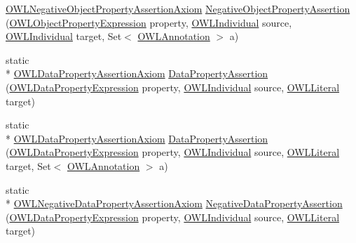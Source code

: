 \begin{DoxyCompactItemize}
\hyperlink{interfaceorg_1_1semanticweb_1_1owlapi_1_1model_1_1_o_w_l_negative_object_property_assertion_axiom}{O\-W\-L\-Negative\-Object\-Property\-Assertion\-Axiom} \hyperlink{classorg_1_1semanticweb_1_1owlapi_1_1apibinding_1_1_o_w_l_functional_syntax_factory_a30bb1b8b1abc6965a0b69b768973f9f8}{Negative\-Object\-Property\-Assertion} (\hyperlink{interfaceorg_1_1semanticweb_1_1owlapi_1_1model_1_1_o_w_l_object_property_expression}{O\-W\-L\-Object\-Property\-Expression} property, \hyperlink{interfaceorg_1_1semanticweb_1_1owlapi_1_1model_1_1_o_w_l_individual}{O\-W\-L\-Individual} source, \hyperlink{interfaceorg_1_1semanticweb_1_1owlapi_1_1model_1_1_o_w_l_individual}{O\-W\-L\-Individual} target, Set$<$ \hyperlink{interfaceorg_1_1semanticweb_1_1owlapi_1_1model_1_1_o_w_l_annotation}{O\-W\-L\-Annotation} $>$ a)
\item 
static \\*
\hyperlink{interfaceorg_1_1semanticweb_1_1owlapi_1_1model_1_1_o_w_l_data_property_assertion_axiom}{O\-W\-L\-Data\-Property\-Assertion\-Axiom} \hyperlink{classorg_1_1semanticweb_1_1owlapi_1_1apibinding_1_1_o_w_l_functional_syntax_factory_a8d9328547c31f9b8df4bcf84335d1baf}{Data\-Property\-Assertion} (\hyperlink{interfaceorg_1_1semanticweb_1_1owlapi_1_1model_1_1_o_w_l_data_property_expression}{O\-W\-L\-Data\-Property\-Expression} property, \hyperlink{interfaceorg_1_1semanticweb_1_1owlapi_1_1model_1_1_o_w_l_individual}{O\-W\-L\-Individual} source, \hyperlink{interfaceorg_1_1semanticweb_1_1owlapi_1_1model_1_1_o_w_l_literal}{O\-W\-L\-Literal} target)
\item 
static \\*
\hyperlink{interfaceorg_1_1semanticweb_1_1owlapi_1_1model_1_1_o_w_l_data_property_assertion_axiom}{O\-W\-L\-Data\-Property\-Assertion\-Axiom} \hyperlink{classorg_1_1semanticweb_1_1owlapi_1_1apibinding_1_1_o_w_l_functional_syntax_factory_a33b10f194d3e8971f8739b282e2637a2}{Data\-Property\-Assertion} (\hyperlink{interfaceorg_1_1semanticweb_1_1owlapi_1_1model_1_1_o_w_l_data_property_expression}{O\-W\-L\-Data\-Property\-Expression} property, \hyperlink{interfaceorg_1_1semanticweb_1_1owlapi_1_1model_1_1_o_w_l_individual}{O\-W\-L\-Individual} source, \hyperlink{interfaceorg_1_1semanticweb_1_1owlapi_1_1model_1_1_o_w_l_literal}{O\-W\-L\-Literal} target, Set$<$ \hyperlink{interfaceorg_1_1semanticweb_1_1owlapi_1_1model_1_1_o_w_l_annotation}{O\-W\-L\-Annotation} $>$ a)
\item 
static \\*
\hyperlink{interfaceorg_1_1semanticweb_1_1owlapi_1_1model_1_1_o_w_l_negative_data_property_assertion_axiom}{O\-W\-L\-Negative\-Data\-Property\-Assertion\-Axiom} \hyperlink{classorg_1_1semanticweb_1_1owlapi_1_1apibinding_1_1_o_w_l_functional_syntax_factory_a1cb2c1a4314f87f2c9d2ca72ea559567}{Negative\-Data\-Property\-Assertion} (\hyperlink{interfaceorg_1_1semanticweb_1_1owlapi_1_1model_1_1_o_w_l_data_property_expression}{O\-W\-L\-Data\-Property\-Expression} property, \hyperlink{interfaceorg_1_1semanticweb_1_1owlapi_1_1model_1_1_o_w_l_individual}{O\-W\-L\-Individual} source, \hyperlink{interfaceorg_1_1semanticweb_1_1owlapi_1_1model_1_1_o_w_l_literal}{O\-W\-L\-Literal} target)

\end{DoxyCompactItemize}
